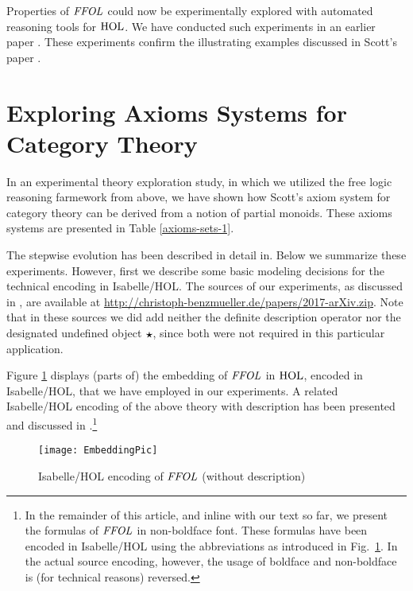 



Properties of $\mathit{FFOL}$ could now be experimentally explored with
automated reasoning tools for $\text{\textrm{HOL}}$. We have conducted such
experiments in 
an earlier paper \cite{ICMS}. These experiments confirm the
illustrating examples discussed in Scott's paper \cite{Scott67}.


\section{Exploring Axioms Systems for Category Theory}
In an experimental theory exploration study, in which we utilized the
free logic reasoning farmework from above, 
we have shown how Scott's
\cite{Scott79} axiom system for category theory can be derived from a
notion of partial monoids. These axioms systems are presented in Table \ref{axioms-sets-1}.

The stepwise evolution has been described in detail in\cite{ArXiv}. Below we
summarize these experiments.  However, first we describe some basic
modeling decisions for the technical encoding in Isabelle/HOL. The
sources of our experiments, as discussed in \cite{ArXiv}, are available at
\url{http://christoph-benzmueller.de/papers/2017-arXiv.zip}. Note that in these
sources we did add neither the definite description operator nor the
designated undefined object $\boldsymbol{\star}$, since both were not required in
this particular application.

Figure \ref{pic1} displays (parts of) the embedding of $\mathit{FFOL}$ in
$\text{\textrm{HOL}}$, encoded in Isabelle/HOL, that we have employed in our
experiments. A related Isabelle/HOL encoding of the above theory with
description has been presented and discussed in
\cite{ICMS}.\footnote{In the remainder of this article, and inline
  with our text so far,  we present the formulas of
  $\mathit{FFOL}$ in non-boldface font. These formulas have been encoded in Isabelle/HOL using the
  abbreviations as introduced in Fig.~\ref{pic1}. In the actual source
  encoding, however, the usage of boldface and non-boldface is
  (for technical reasons) reversed.}

\begin{figure}[htp]
 \texttt{[image: EmbeddingPic]}
 \caption{Isabelle/HOL encoding of $\mathit{FFOL}$ (without description)\label{pic1}}
\end{figure}




